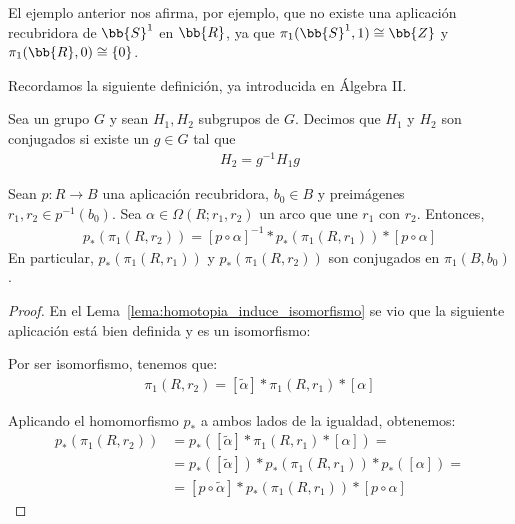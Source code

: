 \begin{ejemplo}
    El ejemplo anterior nos afirma, por ejemplo, que no existe una aplicación recubridora de $\bb{S}^1$ en $\bb{R}$, ya que $\pi_1(\bb{S}^1,1)\cong \bb{Z}$ y $\pi_1(\bb{R},0)\cong \{0\}$.
\end{ejemplo}

Recordamos la siguiente definición, ya introducida en Álgebra II.
\begin{definicion}
    Sea un grupo $G$ y sean $H_1,H_2$ subgrupos de $G$. Decimos que $H_1$ y $H_2$ son conjugados si existe un $g\in G$ tal que 
    \begin{gather*}
        H_2=g^{-1}H_1 g
    \end{gather*}
\end{definicion}

\begin{lema}\label{lema:subgrupos_conjugados}
    Sean $p:R \to B$ una aplicación recubridora, $b_0\in B$ y preimágenes $r_1,r_2\in p^{-1}(b_0)$. Sea $\alpha\in \Omega(R;r_1,r_2)$ un arco que une $r_1$ con $r_2$. Entonces,
    \begin{gather*}
        p_*(\pi_1(R,r_2)) = [p\circ\alpha]^{-1} \ast p_*(\pi_1(R,r_1)) \ast [p\circ\alpha]
    \end{gather*}
    En particular, $p_*(\pi_1(R,r_1))$ y $p_*(\pi_1(R,r_2))$ son conjugados en $\pi_1(B,b_0)$.

    \begin{proof}
        En el Lema~\ref{lema:homotopia_induce_isomorfismo} se vio que la siguiente aplicación está bien definida y es un isomorfismo:

        Por ser isomorfismo, tenemos que:
        \begin{gather*}
            \pi_1(R,r_2) = [\tilde{\alpha}] \ast \pi_1(R,r_1) \ast [\alpha]
        \end{gather*}

        Aplicando el homomorfismo $p_*$ a ambos lados de la igualdad, obtenemos:
        \begin{align*}
            p_*(\pi_1(R,r_2)) &= p_*([\tilde{\alpha}] \ast \pi_1(R,r_1) \ast [\alpha]) =\\
            &= p_*([\tilde{\alpha}]) \ast p_*(\pi_1(R,r_1)) \ast p_*([\alpha]) =\\
            &= [p\circ \tilde{\alpha}] \ast p_*(\pi_1(R,r_1)) \ast [p\circ \alpha]
        \end{align*}


\end{proof}
\end{lema}
